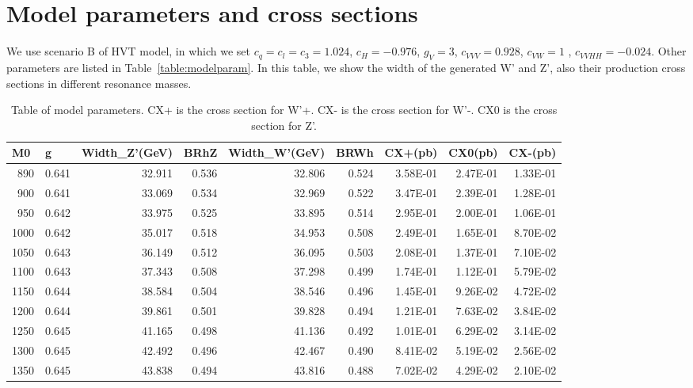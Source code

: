 \newpage
\section{Model parameters and cross sections}
\label{appendix:modelParam}

We use scenario B of HVT model, in which 
we set $c_{q} = c_{l} = c_{3} = 1.024$, $c_{H} = -0.976$, $g_{V} = 3$, 
$c_{VVV} = 0.928$, $c_{VW} = 1$ , $c_{VVHH} = -0.024$. Other parameters 
are listed in Table~\ref{table:modelparam}.
In this table, we show the width of the generated W' and Z', also their production
 cross 
sections in different resonance masses.  

\begin{table}[htbp]
\caption{Table of model parameters. CX+ is the cross section for W'+. 
CX- is the cross section for W'-. CX0 is the cross section for Z'.}
\begin{tabular}{|r|r|r|r|r|r|r|r|r|}
\hline
\multicolumn{1}{|l|}{M0} & \multicolumn{1}{l|}{ g} & \multicolumn{1}{l|}{Width\_Z'(GeV)} & \multicolumn{1}{l|}{BRhZ} & \multicolumn{1}{l|}{Width\_W'(GeV)} & \multicolumn{1}{l|}{BRWh} & \multicolumn{1}{l|}{ CX+(pb)} & \multicolumn{1}{l|}{ CX0(pb)} & \multicolumn{1}{l|}{ CX-(pb)} \\ \hline
890 & 0.641 & 32.911 & 0.536 & 32.806 & 0.524 & 3.58E-01 & 2.47E-01 & 1.33E-01 \\ \hline
900 & 0.641 & 33.069 & 0.534 & 32.969 & 0.522 & 3.47E-01 & 2.39E-01 & 1.28E-01 \\ \hline
950 & 0.642 & 33.975 & 0.525 & 33.895 & 0.514 & 2.95E-01 & 2.00E-01 & 1.06E-01 \\ \hline
1000 & 0.642 & 35.017 & 0.518 & 34.953 & 0.508 & 2.49E-01 & 1.65E-01 & 8.70E-02 \\ \hline
1050 & 0.643 & 36.149 & 0.512 & 36.095 & 0.503 & 2.08E-01 & 1.37E-01 & 7.10E-02 \\ \hline
1100 & 0.643 & 37.343 & 0.508 & 37.298 & 0.499 & 1.74E-01 & 1.12E-01 & 5.79E-02 \\ \hline
1150 & 0.644 & 38.584 & 0.504 & 38.546 & 0.496 & 1.45E-01 & 9.26E-02 & 4.72E-02 \\ \hline
1200 & 0.644 & 39.861 & 0.501 & 39.828 & 0.494 & 1.21E-01 & 7.63E-02 & 3.84E-02 \\ \hline
1250 & 0.645 & 41.165 & 0.498 & 41.136 & 0.492 & 1.01E-01 & 6.29E-02 & 3.14E-02 \\ \hline
1300 & 0.645 & 42.492 & 0.496 & 42.467 & 0.490 & 8.41E-02 & 5.19E-02 & 2.56E-02 \\ \hline
1350 & 0.645 & 43.838 & 0.494 & 43.816 & 0.488 & 7.02E-02 & 4.29E-02 & 2.10E-02 \\ \hline

\end{tabular}
\end{table}
